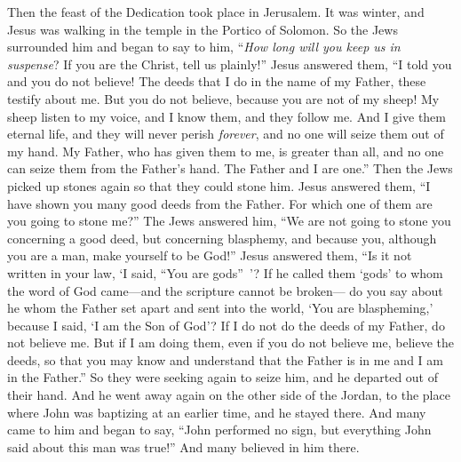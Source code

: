 \begin{biblechapter}
 Then the feast of the Dedication took place in Jerusalem. It was winter,
\verse and Jesus was walking in the temple in the Portico of Solomon.
\verse So the Jews surrounded him and began to say to him, “\textit{How long will you keep us in suspense}? If you are the Christ, tell us plainly!”
\verse Jesus answered them, “I told you and you do not believe! The deeds that I do in the name of my Father, these testify about me.
\verse But you do not believe, because you are not of my sheep!
\verse My sheep listen to my voice, and I know them, and they follow me.
\verse And I give them eternal life, and they will never perish \textit{forever}, and no one will seize them out of my hand.
\verse My Father, who has given them to me, is greater than all, and no one can seize them from the Father’s hand.
\verse The Father and I are one.”
\verse Then the Jews picked up stones again so that they could stone him.
\verse Jesus answered them, “I have shown you many good deeds from the Father. For which one of them are you going to stone me?”
\verse The Jews answered him, “We are not going to stone you concerning a good deed, but concerning blasphemy, and because you, although you are a man, make yourself to be God!”
\verse Jesus answered them, “Is it not written in your law, ‘I said, “You are gods” ’?
\verse If he called them ‘gods’ to whom the word of God came—and the scripture cannot be broken—
\verse do you say about he whom the Father set apart and sent into the world, ‘You are blaspheming,’ because I said, ‘I am the Son of God’?
\verse If I do not do the deeds of my Father, do not believe me.
\verse But if I am doing them, even if you do not believe me, believe the deeds, so that you may know and understand that the Father is in me and I am in the Father.”
\verse So they were seeking again to seize him, and he departed out of their hand.
\verse And he went away again on the other side of the Jordan, to the place where John was baptizing at an earlier time, and he stayed there.
\verse And many came to him and began to say, “John performed no sign, but everything John said about this man was true!”
\verse And many believed in him there.
\end{biblechapter}

